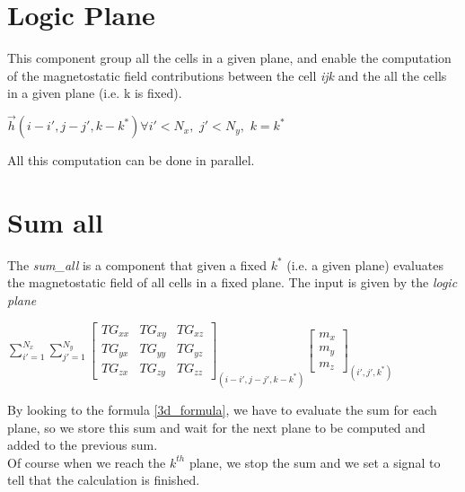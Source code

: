      \section{Logic Plane}
     This component group all the cells in a given plane, and enable the computation of the magnetostatic field contributions between the cell \textit{ijk} and the all the cells in a given plane (i.e. k is fixed).
     \begin{center}
     	$ \overrightarrow{h}(i-i',j-j',k-k^*)$\quad \quad $ \forall i'<N_x,$ $ j'<N_y,$ $ k=k^* $
     \end{center}
          All this computation can be done in parallel.
    \section{Sum all}
    The \textit{sum\_all} is a component that given a fixed $ k^* $ (i.e. a given plane) evaluates the magnetostatic field of all cells in a fixed plane.
    The input is given by the \textit{logic plane}
    \begin{center}
    	$ \sum\limits_{i'=1}^{N_{x}} \sum\limits_{j'=1}^{N_{y}}\begin{bmatrix}
    	TG_{xx} & TG_{xy} & TG_{xz}\\
    	TG_{yx} & TG_{yy}& TG_{yz}    	\\
    	TG_{zx}&TG_{zy} & TG_{zz}  
    	\end{bmatrix}_{(i-i',j-j',k-k^*)}\begin{bmatrix}
    	m_{x}\\
    	m_{y}\\
    	m_{z}\end{bmatrix}_{(i',j',k^*)} $
    \end{center}
    By looking to the formula \ref{3d_formula}, we have to evaluate the sum for each plane, so we store this sum and wait for the next plane to be computed and added to the previous sum.\\
    Of course when we reach the $ k^{th} $ plane, we stop the sum and we set a signal to tell that the calculation is finished.
  